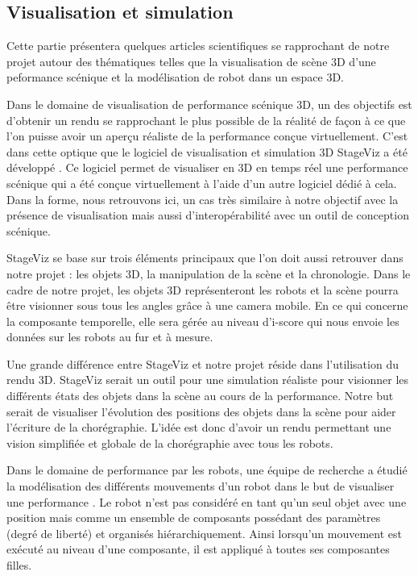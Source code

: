 \subsection{Visualisation et simulation}

Cette partie présentera quelques articles scientifiques se rapprochant de notre projet autour des thématiques telles que la visualisation de scène 3D d'une peformance scénique et la modélisation de robot dans un espace 3D. 

Dans le domaine de visualisation de performance scénique 3D, un des objectifs est d'obtenir un rendu se rapprochant le plus possible de la réalité de façon à ce que l'on puisse avoir un aperçu réaliste de la performance conçue virtuellement. C'est dans cette optique que le logiciel de visualisation et simulation 3D StageViz\cite{StageViz} a été développé . Ce logiciel permet de visualiser en 3D en temps réel une performance scénique qui a été conçue virtuellement à l'aide d'un autre logiciel dédié à cela. Dans la forme, nous retrouvons ici, un cas très similaire à notre objectif avec la présence de visualisation mais aussi d'interopérabilité avec un outil de conception scénique.

StageViz se base sur trois éléments principaux que l'on doit aussi retrouver dans notre projet : les objets 3D, la manipulation de la scène et la chronologie. Dans le cadre de notre projet, les objets 3D représenteront les robots et la scène pourra être visionner sous tous les angles grâce à une camera mobile. En ce qui concerne la composante temporelle, elle sera gérée au niveau d'i-score qui nous envoie les données sur les robots au fur et à mesure. 

Une grande différence entre StageViz et notre projet réside dans l'utilisation du rendu 3D. StageViz serait un outil pour une simulation réaliste pour visionner les différents états des objets dans la scène au cours de la performance. Notre but serait de visualiser l'évolution des positions des objets dans la scène pour aider l'écriture de la chorégraphie. L'idée est donc d'avoir un rendu permettant une vision simplifiée et globale de la chorégraphie avec tous les robots.

Dans le domaine de performance par les robots, une équipe de recherche a étudié la modélisation des différents mouvements d'un robot dans le but de visualiser une performance \cite{robotArt}. Le robot n'est pas considéré en tant qu'un seul objet avec une position mais comme un ensemble de composants possédant des paramètres (degré de liberté) et organisés hiérarchiquement. Ainsi lorsqu'un mouvement est exécuté au niveau d'une composante, il est appliqué à toutes ses composantes filles.

